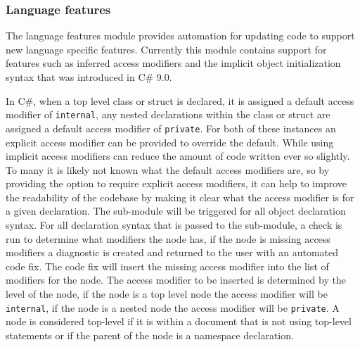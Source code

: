 \subsubsection{Language features}
The language features module provides automation for updating code to support new language specific features. Currently this module contains support for features such as inferred access modifiers and the implicit object initialization syntax that was introduced in C\# 9.0.

In C\#, when a top level class or struct is declared, it is assigned a default access modifier of \texttt{internal}, any nested declarations within the class or struct are assigned a default access modifier of \texttt{private}. For both of these instances an explicit access modifier can be provided to override the default. While using implicit access modifiers can reduce the amount of code written ever so slightly. To many it is likely not known what the default access modifiers are, so by providing the option to require explicit access modifiers, it can help to improve the readability of the codebase by making it clear what the access modifier is for a given declaration.
The sub-module will be triggered for all object declaration syntax. For all declaration syntax that is passed to the sub-module, a check is run to determine what modifiers the node has, if the node is missing access modifiers a diagnostic is created and returned to the user with an automated code fix. The code fix will insert the missing access modifier into the list of modifiers for the node. The access modifier to be inserted is determined by the level of the node, if the node is a top level node the access modifier will be \texttt{internal}, if the node is a nested node the access modifier will be \texttt{private}. A node is considered top-level if it is within a document that is not using top-level statements or if the parent of the node is a namespace declaration.

